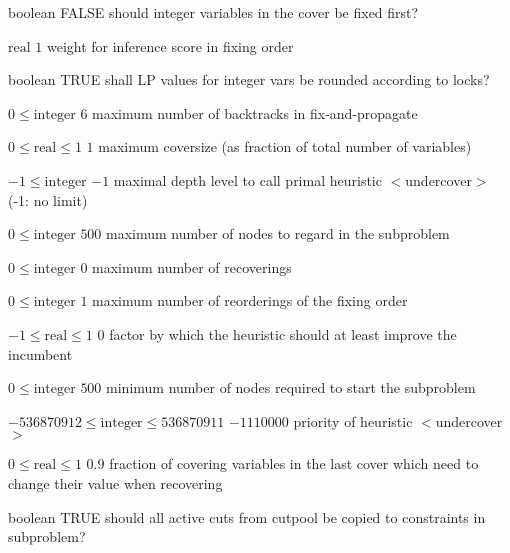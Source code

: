 %
{boolean}%
{FALSE}%
{should integer variables in the cover be fixed first?}%
{}

%
{$\textrm{real}$}%
{$1$}%
{weight for inference score in fixing order}%
{}

%
{boolean}%
{TRUE}%
{shall LP values for integer vars be rounded according to locks?}%
{}

%
{$0\leq\textrm{integer}$}%
{$6$}%
{maximum number of backtracks in fix-and-propagate}%
{}

%
{$0\leq\textrm{real}\leq1$}%
{$1$}%
{maximum coversize (as fraction of total number of variables)}%
{}

%
{$-1\leq\textrm{integer}$}%
{$-1$}%
{maximal depth level to call primal heuristic $<$undercover$>$ (-1: no limit)}%
{}

%
{$0\leq\textrm{integer}$}%
{$500$}%
{maximum number of nodes to regard in the subproblem}%
{}

%
{$0\leq\textrm{integer}$}%
{$0$}%
{maximum number of recoverings}%
{}

%
{$0\leq\textrm{integer}$}%
{$1$}%
{maximum number of reorderings of the fixing order}%
{}

%
{$-1\leq\textrm{real}\leq1$}%
{$0$}%
{factor by which the heuristic should at least improve the incumbent}%
{}

%
{$0\leq\textrm{integer}$}%
{$500$}%
{minimum number of nodes required to start the subproblem}%
{}

%
{$-536870912\leq\textrm{integer}\leq536870911$}%
{$-1110000$}%
{priority of heuristic $<$undercover$>$}%
{}

%
{$0\leq\textrm{real}\leq1$}%
{$0.9$}%
{fraction of covering variables in the last cover which need to change their value when recovering}%
{}

%
{boolean}%
{TRUE}%
{should all active cuts from cutpool be copied to constraints in subproblem?}%
{}

